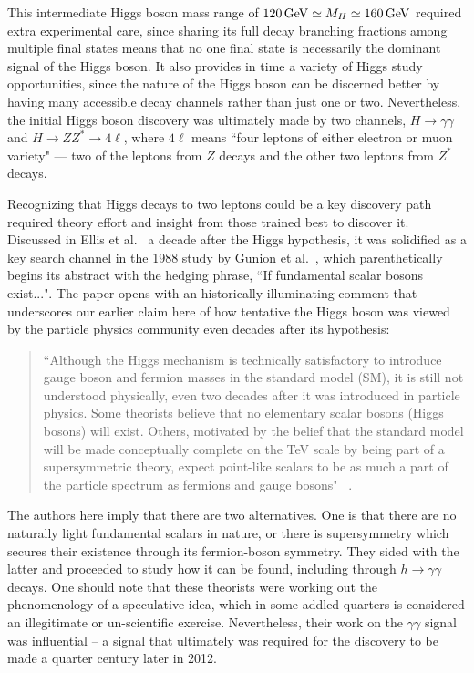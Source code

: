 \documentclass[letter,12pt]{article}
\def\gev{\, {\rm GeV}}
\begin{document}
This intermediate Higgs boson mass range of $120\gev\simeq M_H\simeq 160\gev$ required extra experimental care, since sharing its full decay branching fractions among multiple final states means that no one final state is necessarily the dominant signal of the Higgs boson. It also provides in time a variety of Higgs study opportunities, since the nature of the Higgs boson can be discerned better by having many accessible decay channels rather than just one or two.
Nevertheless, the initial Higgs boson discovery was ultimately made by two channels, $H\to \gamma\gamma$ and $H\to ZZ^*\to 4\ell$, where $4\ell$ means ``four leptons of either electron or muon variety" --- two of the leptons from $Z$ decays and the other two leptons from $Z^*$ decays. 

Recognizing that Higgs decays to two leptons could be a key discovery path required theory effort and insight from those trained best to discover it. Discussed in Ellis et al.~\cite{Ellis:1975ap} a decade after the Higgs hypothesis, it was solidified as a key search channel  in the 1988 study by Gunion et al.~\cite{Gunion:1987ke}, which parenthetically begins its abstract with the hedging phrase, ``If fundamental scalar bosons exist...". The paper opens with an historically illuminating comment that underscores our earlier claim here of how tentative the Higgs boson was viewed by the particle physics community even decades after its hypothesis:
\begin{quote}
``Although the Higgs mechanism is technically satisfactory to introduce gauge
boson and fermion masses in the standard model (SM), it is still not understood
physically, even two decades after it was introduced in particle physics. Some
theorists believe that no elementary scalar bosons (Higgs bosons) will exist.
Others, motivated by the belief that the standard model will be made conceptually
complete on the TeV scale by being part of a supersymmetric theory, expect
point-like scalars to be as much a part of the particle spectrum as fermions and
gauge bosons" ~\cite{Gunion:1987ke}.
\end{quote}
The authors here imply that there are two alternatives. One is that there are no naturally light fundamental scalars in nature, or there is supersymmetry which secures their existence through its fermion-boson symmetry. They sided with the latter and proceeded to study how it can be found, including through $h\to \gamma\gamma$ decays. One should note that these theorists were working out the phenomenology of a speculative idea, which in some addled quarters is considered an illegitimate or un-scientific exercise. Nevertheless, their work on the $\gamma\gamma$ signal was influential -- a signal that ultimately was required for the discovery to be made a quarter century later in 2012. 
\end{document}
